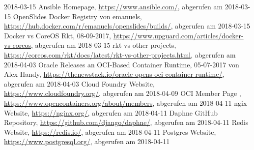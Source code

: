 \documentclass[a4paper]{article}
\begin{document}
\begin{thebibliography}{999}
	2018-03-15
	 Ansible Homepage, \url{https://www.ansible.com/}, 
	abgerufen am 2018-03-15
	 OpenSlides Docker Registry von emanuels, 
	\url{https://hub.docker.com/r/emanuels/openslides/builds/}, abgerufen am 
	2018-03-15
	 \glqq{}Docker vs CoreOS Rkt\grqq{}, 08-09-2017, 
	\url{https://www.upguard.com/articles/docker-vs-coreos}, abgerufen am 
	2018-03-15
	 \glqq{}rkt vs other projects\grqq{}, 
	\url{https://coreos.com/rkt/docs/latest/rkt-vs-other-projects.html}, 
	abgerufen am 2018-04-03
	 \glqq{}Oracle Releases an OCI-Based Container 
	Runtime\grqq{}, 05-07-2017 von Alex Handy,  
	\url{https://thenewstack.io/oracle-opens-oci-container-runtime/}, abgerufen 
	am 2018-04-03
	Cloud Foundry Website, 
	\url{https://www.cloudfoundry.org/}, abgerufen am 2018-04-09
	 OCI Member Page ,
	\url{https://www.opencontainers.org/about/members},
	abgerufen am 2018-04-11
	 ngix Website, \url{https://nginx.org/},
	abgerufen am 2018-04-11
	 Daphne GitHub Repository, 
	\url{https://github.com/django/daphne/},
	abgerufen am 2018-04-11
	 Redis Website, \url{https://redis.io/},
	abgerufen am 2018-04-11
	 Postgres Website, \url{https://www.postgresql.org/},
	abgerufen am 2018-04-11
\end{thebibliography}
\end{document}
